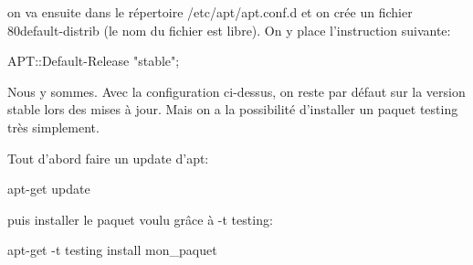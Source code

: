 on va ensuite dans le répertoire /etc/apt/apt.conf.d et on crée un fichier 80default-distrib (le nom du fichier est libre). On y place l’instruction suivante:

APT::Default-Release "stable";

Nous y sommes. Avec la configuration ci-dessus, on reste par défaut sur la version stable lors des mises à jour. Mais on a la possibilité d’installer un paquet testing très simplement.

Tout d’abord faire un update d’apt:

apt-get update

puis installer le paquet voulu grâce à -t testing:

apt-get -t testing install mon_paquet
